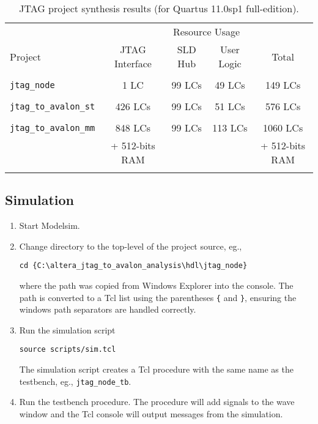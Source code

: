 \documentclass[10pt,twoside]{article}
\begin{document}
%
\begin{table}[t]
\caption{JTAG project synthesis results (for Quartus 11.0sp1 full-edition).}
\label{tab:project_synthesis_results}
\begin{center}
\begin{tabular}{|l||c|c|c||c|}
\hline
        & \multicolumn{4}{c|}{Resource Usage}\\
\cline{2-5}
Project & JTAG Interface & SLD Hub & User Logic & Total\\
\hline\hline
&&&&\\
\verb+jtag_node+         &   1 LC  & 99 LCs &  49 LCs & 149 LCs\\
&&&&\\
\verb+jtag_to_avalon_st+ & 426 LCs & 99 LCs &  51 LCs & 576 LCs\\
&&&&\\
\verb+jtag_to_avalon_mm+ & 848 LCs & 99 LCs & 113 LCs & 1060 LCs\\
                         & + 512-bits RAM &&& + 512-bits RAM\\
&&&&\\
\hline
\end{tabular}
\end{center}
\end{table}

\subsection{Simulation}

\begin{enumerate}
\item Start Modelsim.
\item Change directory to the top-level of the project source, eg.,
%
\begin{verbatim}
cd {C:\altera_jtag_to_avalon_analysis\hdl\jtag_node}
\end{verbatim}
where the path was copied from Windows Explorer into the console.
The path is converted to a Tcl list using the parentheses \verb+{+ 
and \verb+}+, ensuring the windows path separators are handled correctly.
%
\item Run the simulation script
%
\begin{verbatim}
source scripts/sim.tcl
\end{verbatim}
%
The simulation script creates a Tcl procedure with the same
name as the testbench, eg., \verb+jtag_node_tb+. 

\item Run the testbench procedure.
The procedure will add signals to the wave window and the Tcl
console will output messages from the simulation.
%
\end{enumerate}
\end{document}
